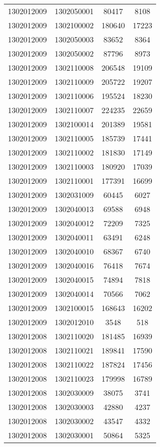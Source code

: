 \begin{longtable}[h]{llcc}
		1302012009 & 1302050001 & 80417 & 8108\\
		1302012009 & 1302100002 & 180640 & 17223\\
		1302012009 & 1302050003 & 83652 & 8364\\
		1302012009 & 1302050002 & 87796 & 8973\\
		1302012009 & 1302110008 & 206548 & 19109\\
		1302012009 & 1302110009 & 205722 & 19207\\
		1302012009 & 1302110006 & 195524 & 18230\\
		1302012009 & 1302110007 & 224235 & 22659\\
		1302012009 & 1302100014 & 201389 & 19581\\
		1302012009 & 1302110005 & 185739 & 17441\\
		1302012009 & 1302110002 & 181830 & 17149\\
		1302012009 & 1302110003 & 180920 & 17039\\
		1302012009 & 1302110001 & 177391 & 16699\\
		1302012009 & 1302031009 & 60445 & 6027\\
		1302012009 & 1302040013 & 69588 & 6948\\
		1302012009 & 1302040012 & 72209 & 7325\\
		1302012009 & 1302040011 & 63491 & 6248\\
		1302012009 & 1302040010 & 68367 & 6740\\
		1302012009 & 1302040016 & 76418 & 7674\\
		1302012009 & 1302040015 & 74894 & 7818\\
		1302012009 & 1302040014 & 70566 & 7062\\
		1302012009 & 1302100015 & 168643 & 16202\\
		1302012009 & 1302012010 & 3548 & 518\\
		1302012008 & 1302110020 & 181485 & 16939\\
		1302012008 & 1302110021 & 189841 & 17590\\
		1302012008 & 1302110022 & 187824 & 17456\\
		1302012008 & 1302110023 & 179998 & 16789\\
		1302012008 & 1302030009 & 38075 & 3741\\
		1302012008 & 1302030003 & 42880 & 4237\\
		1302012008 & 1302030002 & 43547 & 4332\\
		1302012008 & 1302030001 & 50864 & 5325\\

\end{longtable}

